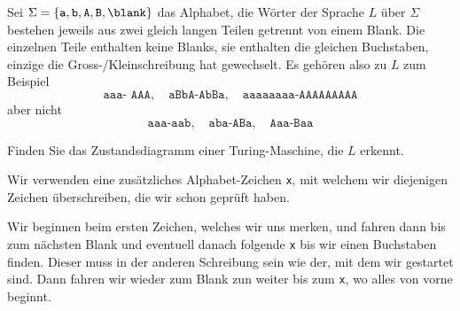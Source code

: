 Sei $\Sigma=\{\texttt{a},\texttt{b},\texttt{A},\texttt{B},\blank\}$
das Alphabet, die Wörter der Sprache $L$ über $\Sigma$ bestehen
jeweils aus zwei gleich langen Teilen getrennt von einem Blank.
Die einzelnen Teile enthalten keine Blanks,
sie enthalten die gleichen Buchstaben, einzige die
Gross-/Kleinschreibung hat gewechselt.
Es gehören also zu $L$ zum Beispiel
\[
\texttt{aaa- AAA},\quad
\texttt{aBbA-AbBa},\quad
\texttt{aaaaaaaa-AAAAAAAAA}
\]
aber nicht
\[
\texttt{aaa-aab},\quad
\texttt{aba-ABa},\quad
\texttt{Aaa-Baa}
\]

Finden Sie das Zustandsdiagramm einer Turing-Maschine, die $L$ erkennt.


\begin{loesung}
Wir verwenden eine zusätzliches Alphabet-Zeichen \texttt{x}, mit welchem
wir diejenigen Zeichen überschreiben, die wir schon geprüft haben.

Wir beginnen beim ersten Zeichen, welches wir uns merken, und fahren
dann bis zum nächsten Blank und eventuell danach folgende \texttt{x}
bis wir einen Buchstaben finden.
Dieser muss in der anderen Schreibung sein wie der, mit dem wir
gestartet sind.
Dann fahren wir wieder zum Blank zun weiter bis zum \texttt{x}, wo alles
von vorne beginnt.


\end{loesung}
